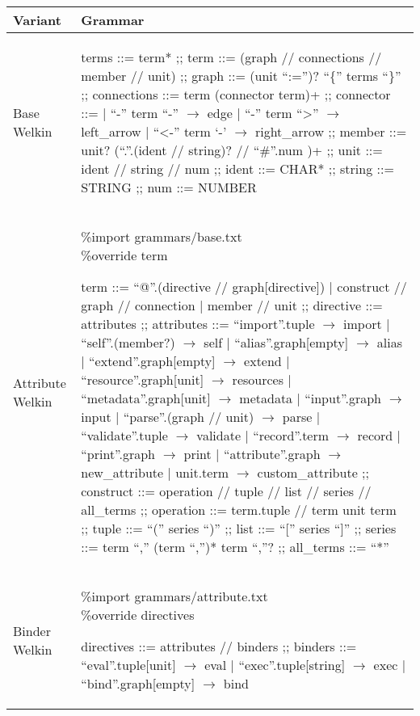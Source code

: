 
\begin{table}[hbt!]
  \centering
    \begin{tabular}{| p{1.5cm} | p{9.5cm} |}%
    \hline
    Variant & Grammar \\\hline %
      \makecell{Base \\ Welkin} &
  \begin{bnf}
  terms ::= term* ;;
  term ::= (graph // connections // member // unit) ;;
  graph ::= (unit ``:='')? ``\{'' terms ``\}'' ;;
  connections ::= term (connector term)+ ;;
	connector ::=
   | ``-'' term ``-'' $\to$ edge
   | ``-'' term ``>'' $\to$ left\_arrow
	 | ``<-'' term `-' $\to$ right\_arrow ;;
  member ::= unit? (``.''.(ident // string)? // ``\#''.num )+ ;;
	unit ::= ident // string // num ;;
  ident ::= CHAR* ;;
	string ::= STRING ;;
	num ::= NUMBER
\end{bnf} \\ %
   \hline
      Attribute Welkin &
  \makecell{\%import grammars/base.txt \\ \%override term}
  \begin{bnf}
  term ::= ``@''.(directive // graph[directive]) | construct // graph // connection | member // unit ;;
  directive ::= attributes ;;
  attributes ::= ``import''.tuple $\to$ import
  | ``self''.(member?) $\to$ self
  | ``alias''.graph[empty] $\to$ alias
  | ``extend''.graph[empty] $\to$ extend
  | ``resource''.graph[unit] $\to$ resources
  | ``metadata''.graph[unit] $\to$ metadata
  | ``input''.graph $\to$ input
  | ``parse''.(graph // unit) $\to$ parse
  | ``validate''.tuple $\to$ validate
  | ``record''.term $\to$ record
  | ``print''.graph $\to$ print
  | ``attribute''.graph $\to$ new\_attribute
  | unit.term $\to$ custom\_attribute ;;
  construct ::= operation // tuple // list // series // all\_terms ;;
  operation ::= term.tuple // term unit term ;;
  tuple ::= ``('' series ``)'' ;;
  list ::= ``['' series ``]'' ;;
  series ::= term ``,'' (term ``,'')* term ``,''? ;;
  all\_terms ::= ``*''
 \end{bnf} \\
   \hline
   Binder Welkin &
\makecell{\%import grammars/attribute.txt \\ \%override directives}
    \begin{bnf}
     directives ::= attributes // binders ;;
     binders ::= ``eval''.tuple[unit] $\to$ eval
     | ``exec''.tuple[string] $\to$ exec
     | ``bind''.graph[empty] $\to$ bind
   \end{bnf} \\
    \hline
    \end{tabular}
  \end{table}


